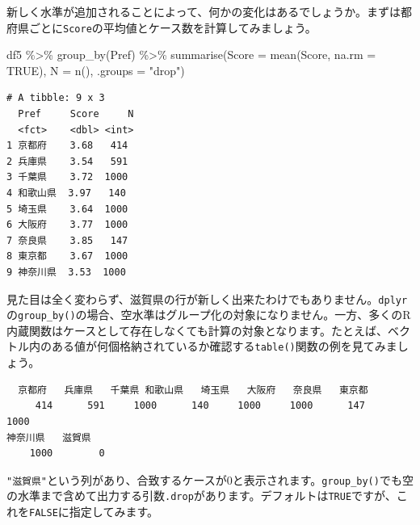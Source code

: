 \documentclass[
  a4paper,
  pandoc,
  ja=standard,
  jafont=haranoaji]{bxjsbook}
\newenvironment{Shaded}{\begin{snugshade}}{\end{snugshade}}
\newcommand{\AttributeTok}[1]{\textcolor[rgb]{0.00,0.48,0.65}{#1}}
\newcommand{\ConstantTok}[1]{\textcolor[rgb]{0.56,0.35,0.01}{#1}}
\newcommand{\FunctionTok}[1]{\textcolor[rgb]{0.28,0.35,0.67}{#1}}
\newcommand{\NormalTok}[1]{\textcolor[rgb]{0.00,0.48,0.65}{#1}}
\newcommand{\SpecialCharTok}[1]{\textcolor[rgb]{0.37,0.37,0.37}{#1}}
\newcommand{\StringTok}[1]{\textcolor[rgb]{0.13,0.47,0.30}{#1}}
\begin{document}
新しく水準が追加されることによって、何かの変化はあるでしょうか。まずは都府県ごとに\texttt{Score}の平均値とケース数を計算してみましょう。

\begin{Shaded}
\begin{Highlighting}[numbers=left,,]
\NormalTok{df5 }\SpecialCharTok{\%\textgreater{}\%}
  \FunctionTok{group\_by}\NormalTok{(Pref) }\SpecialCharTok{\%\textgreater{}\%}
  \FunctionTok{summarise}\NormalTok{(}\AttributeTok{Score   =} \FunctionTok{mean}\NormalTok{(Score, }\AttributeTok{na.rm =} \ConstantTok{TRUE}\NormalTok{),}
            \AttributeTok{N       =} \FunctionTok{n}\NormalTok{(),}
            \AttributeTok{.groups =} \StringTok{"drop"}\NormalTok{)}
\end{Highlighting}
\end{Shaded}

\begin{verbatim}
# A tibble: 9 x 3
  Pref     Score     N
  <fct>    <dbl> <int>
1 京都府    3.68   414
2 兵庫県    3.54   591
3 千葉県    3.72  1000
4 和歌山県  3.97   140
5 埼玉県    3.64  1000
6 大阪府    3.77  1000
7 奈良県    3.85   147
8 東京都    3.67  1000
9 神奈川県  3.53  1000
\end{verbatim}

見た目は全く変わらず、滋賀県の行が新しく出来たわけでもありません。\texttt{dplyr}の\texttt{group\_by()}の場合、空水準はグループ化の対象になりません。一方、多くのR内蔵関数はケースとして存在しなくても計算の対象となります。たとえば、ベクトル内のある値が何個格納されているか確認する\texttt{table()}関数の例を見てみましょう。

\begin{Shaded}
\end{Shaded}

\begin{verbatim}
  京都府   兵庫県   千葉県 和歌山県   埼玉県   大阪府   奈良県   東京都 
     414      591     1000      140     1000     1000      147     1000 
神奈川県   滋賀県 
    1000        0 
\end{verbatim}

\texttt{"滋賀県"}という列があり、合致するケースが0と表示されます。\texttt{group\_by()}でも空の水準まで含めて出力する引数\texttt{.drop}があります。デフォルトは\texttt{TRUE}ですが、これを\texttt{FALSE}に指定してみます。
\end{document}
